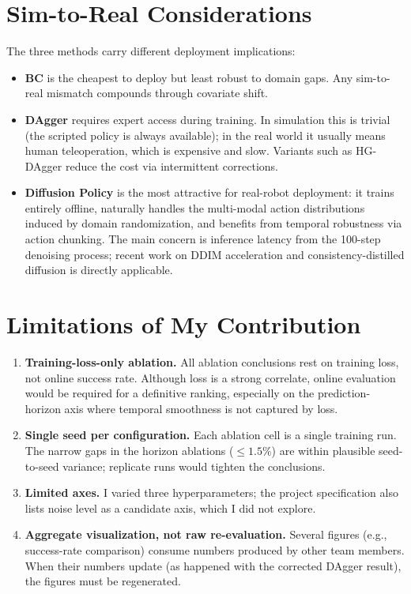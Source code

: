 \documentclass[11pt]{article}
\begin{document}
\section{Sim-to-Real Considerations}

The three methods carry different deployment implications:

\begin{itemize}
    \item \textbf{BC} is the cheapest to deploy but least robust to
    domain gaps. Any sim-to-real mismatch compounds through covariate
    shift.
    \item \textbf{DAgger} requires expert access during training. In
    simulation this is trivial (the scripted policy is always
    available); in the real world it usually means human teleoperation,
    which is expensive and slow. Variants such as HG-DAgger reduce the
    cost via intermittent corrections.
    \item \textbf{Diffusion Policy} is the most attractive for
    real-robot deployment: it trains entirely offline, naturally
    handles the multi-modal action distributions induced by domain
    randomization, and benefits from temporal robustness via action
    chunking. The main concern is inference latency from the 100-step
    denoising process; recent work on DDIM acceleration and
    consistency-distilled diffusion is directly applicable.
\end{itemize}

\section{Limitations of My Contribution}

\begin{enumerate}
    \item \textbf{Training-loss-only ablation.} All ablation
    conclusions rest on training loss, not online success rate.
    Although loss is a strong correlate, online evaluation would be
    required for a definitive ranking, especially on the prediction-
    horizon axis where temporal smoothness is not captured by loss.
    \item \textbf{Single seed per configuration.} Each ablation cell
    is a single training run. The narrow gaps in the horizon
    ablations ($\le 1.5\%$) are within plausible seed-to-seed
    variance; replicate runs would tighten the conclusions.
    \item \textbf{Limited axes.} I varied three hyperparameters; the
    project specification also lists noise level as a candidate axis,
    which I did not explore.
    \item \textbf{Aggregate visualization, not raw re-evaluation.}
    Several figures (e.g., success-rate comparison) consume numbers
    produced by other team members. When their numbers update (as
    happened with the corrected DAgger result), the figures must be
    regenerated.
\end{enumerate}
\end{document}
